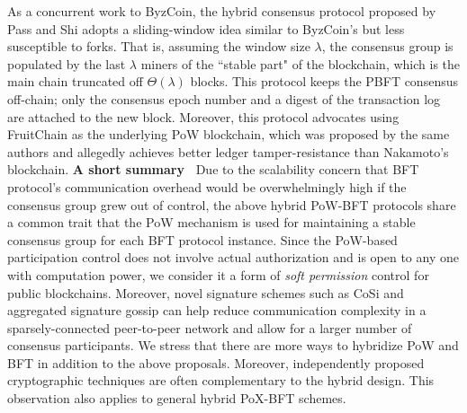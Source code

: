 As a concurrent work to ByzCoin, the hybrid consensus protocol proposed by Pass and Shi  adopts a sliding-window idea similar to ByzCoin's but less susceptible to forks. That is, assuming the window size $\lambda$, the consensus group is populated by the last $\lambda$ miners of the ``stable part" of the blockchain, which is the main chain truncated off $\Theta(\lambda)$ blocks. This protocol keeps the PBFT consensus off-chain; only the consensus epoch number and a digest of the transaction log are attached to the new block. Moreover, this protocol advocates using FruitChain  as the underlying PoW blockchain, which was proposed by the same authors and allegedly achieves better ledger tamper-resistance than Nakamoto's blockchain.
\textbf{A short summary~}
Due to the scalability concern that BFT protocol's communication overhead would be overwhelmingly high if the consensus group grew out of control, the above hybrid PoW-BFT protocols share a common trait that the PoW mechanism is used for maintaining a stable consensus group for each BFT protocol instance. Since the PoW-based participation control does not involve actual authorization and is open to any one with computation power, we consider it a form of \textit{soft permission} control for public blockchains. Moreover, novel signature schemes such as CoSi  and aggregated signature gossip  can help reduce communication complexity in a sparsely-connected peer-to-peer network and allow for a larger number of consensus participants.
We stress that there are more ways to hybridize PoW and BFT in addition to the above proposals. Moreover, independently proposed cryptographic techniques are often complementary to the hybrid design. This observation also applies to general hybrid PoX-BFT schemes.

